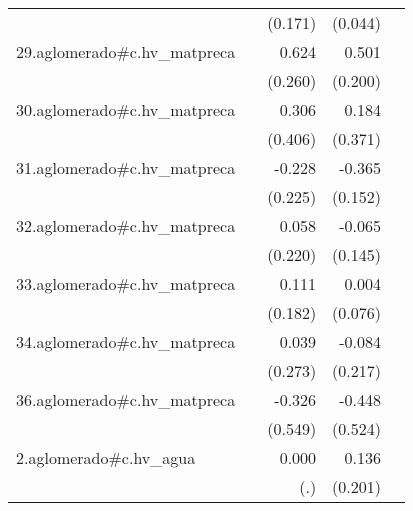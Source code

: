 {\begin{longtable}{l*{4}{D{.}{.}{-1}}}
            &                     &     (0.171)         &     (0.044)         &                     \\
\addlinespace
29.aglomerado#c.hv\_matpreca&                     &       0.624\sym{*}  &       0.501\sym{*}  &                     \\
            &                     &     (0.260)         &     (0.200)         &                     \\
\addlinespace
30.aglomerado#c.hv\_matpreca&                     &       0.306         &       0.184         &                     \\
            &                     &     (0.406)         &     (0.371)         &                     \\
\addlinespace
31.aglomerado#c.hv\_matpreca&                     &      -0.228         &      -0.365\sym{*}  &                     \\
            &                     &     (0.225)         &     (0.152)         &                     \\
\addlinespace
32.aglomerado#c.hv\_matpreca&                     &       0.058         &      -0.065         &                     \\
            &                     &     (0.220)         &     (0.145)         &                     \\
\addlinespace
33.aglomerado#c.hv\_matpreca&                     &       0.111         &       0.004         &                     \\
            &                     &     (0.182)         &     (0.076)         &                     \\
\addlinespace
34.aglomerado#c.hv\_matpreca&                     &       0.039         &      -0.084         &                     \\
            &                     &     (0.273)         &     (0.217)         &                     \\
\addlinespace
36.aglomerado#c.hv\_matpreca&                     &      -0.326         &      -0.448         &                     \\
            &                     &     (0.549)         &     (0.524)         &                     \\
\addlinespace
2.aglomerado#c.hv\_agua&                     &       0.000         &       0.136         &                     \\
            &                     &         (.)         &     (0.201)         &                     \\

\end{longtable}}
